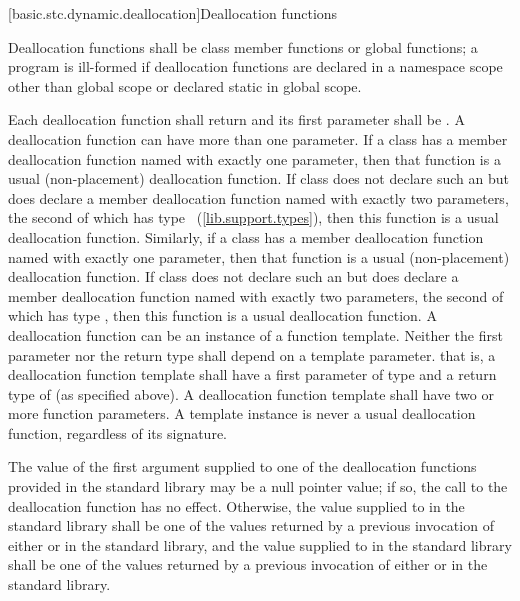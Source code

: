 [basic.stc.dynamic.deallocation]{Deallocation functions}

\pnum
{}%
Deallocation functions shall be class member functions or global
functions; a program is ill-formed if deallocation functions are
declared in a namespace scope other than global scope or declared static
in global scope.

\pnum
{}%
Each deallocation function shall return  and its first
parameter shall be . A deallocation function can have more
than one parameter. If a class  has a member deallocation
function named   with exactly one
parameter, then that function is a usual (non-placement) deallocation
function. If class  does not declare such an 
 but does declare a member deallocation function named
  with exactly two parameters, the second
of which has type ~(\ref{lib.support.types}), then this
function is a usual deallocation function. Similarly, if a class
 has a member deallocation function named 
 with exactly one parameter, then that function is a
usual (non-placement) deallocation function. If class  does not
declare such an   but does declare a
member deallocation function named  
with exactly two parameters, the second of which has type
, then this function is a usual deallocation
function. A deallocation function can be an instance of a function
template. Neither the first parameter nor the return type shall depend
on a template parameter. \enternote that is, a deallocation function
template shall have a first parameter of type  and a return
type of  (as specified above). \exitnote A deallocation
function template shall have two or more function parameters. A template
instance is never a usual deallocation function, regardless of its
signature.

\pnum
The value of the first argument supplied to one of the deallocation
functions provided in the standard library may
be a null pointer value; if so, the call to the deallocation function
has no effect. Otherwise, the
value supplied to   in the standard
library shall be one of the values returned by a previous invocation of
either   or 
   in the
standard library, and the value supplied to 
 in the standard library shall be one of the
values returned by a previous invocation of either 
 or 
   in
the standard library.

